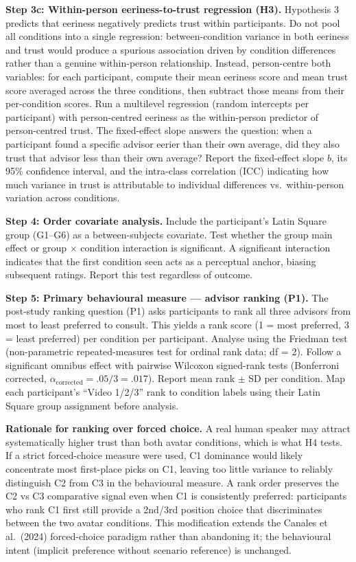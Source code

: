 \documentclass[11pt, a4paper]{article}
\begin{document}
\textbf{Step 3c: Within-person eeriness-to-trust regression (H3).} Hypothesis 3 predicts that eeriness negatively predicts trust within participants. Do not pool all conditions into a single regression: between-condition variance in both eeriness and trust would produce a spurious association driven by condition differences rather than a genuine within-person relationship. Instead, person-centre both variables: for each participant, compute their mean eeriness score and mean trust score averaged across the three conditions, then subtract those means from their per-condition scores. Run a multilevel regression (random intercepts per participant) with person-centred eeriness as the within-person predictor of person-centred trust. The fixed-effect slope answers the question: when a participant found a specific advisor eerier than their own average, did they also trust that advisor less than their own average? Report the fixed-effect slope $b$, its 95\% confidence interval, and the intra-class correlation (ICC) indicating how much variance in trust is attributable to individual differences vs.\ within-person variation across conditions.

\textbf{Step 4: Order covariate analysis.} Include the participant's Latin Square group (G1--G6) as a between-subjects covariate. Test whether the group main effect or group $\times$ condition interaction is significant. A significant interaction indicates that the first condition seen acts as a perceptual anchor, biasing subsequent ratings. Report this test regardless of outcome.

\textbf{Step 5: Primary behavioural measure --- advisor ranking (P1).} The post-study ranking question (P1) asks participants to rank all three advisors from most to least preferred to consult. This yields a rank score (1 = most preferred, 3 = least preferred) per condition per participant. Analyse using the Friedman test (non-parametric repeated-measures test for ordinal rank data; df = 2). Follow a significant omnibus effect with pairwise Wilcoxon signed-rank tests (Bonferroni corrected, $\alpha_\text{corrected} = .05/3 = .017$). Report mean rank $\pm$ SD per condition. Map each participant's ``Video 1/2/3'' rank to condition labels using their Latin Square group assignment before analysis.

\textbf{Rationale for ranking over forced choice.} A real human speaker may attract systematically higher trust than both avatar conditions, which is what H4 tests. If a strict forced-choice measure were used, C1 dominance would likely concentrate most first-place picks on C1, leaving too little variance to reliably distinguish C2 from C3 in the behavioural measure. A rank order preserves the C2 vs C3 comparative signal even when C1 is consistently preferred: participants who rank C1 first still provide a 2nd/3rd position choice that discriminates between the two avatar conditions. This modification extends the Canales et al.\ (2024) forced-choice paradigm rather than abandoning it; the behavioural intent (implicit preference without scenario reference) is unchanged.
\end{document}
